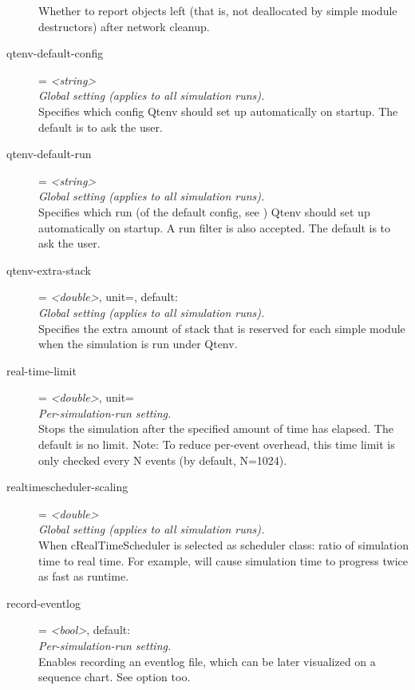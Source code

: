 \begin{description}
    Whether to report objects left (that is, not deallocated by simple module
    destructors) after network cleanup.
\item[qtenv-default-config] = \textit{<string>}\\
    \textit{Global setting (applies to all simulation runs).}\\
    Specifies which config Qtenv should set up automatically on startup. The
    default is to ask the user.
\item[qtenv-default-run] = \textit{<string>}\\
    \textit{Global setting (applies to all simulation runs).}\\
    Specifies which run (of the default config, see
    ) Qtenv should set up
    automatically on startup. A run filter is also accepted. The default is to
    ask the user.
\item[qtenv-extra-stack] = \textit{<double>}, unit=, default: \\
    \textit{Global setting (applies to all simulation runs).}\\
    Specifies the extra amount of stack that is reserved for each
     simple module when the simulation is run under Qtenv.
\item[real-time-limit] = \textit{<double>}, unit=\\
    \textit{Per-simulation-run setting.}\\
    Stops the simulation after the specified amount of time has elapsed. The
    default is no limit. Note: To reduce per-event overhead, this time limit is
    only checked every N events (by default, N=1024).
\item[realtimescheduler-scaling] = \textit{<double>}\\
    \textit{Global setting (applies to all simulation runs).}\\
    When cRealTimeScheduler is selected as scheduler class: ratio of simulation
    time to real time. For example,
     will cause
    simulation time to progress twice as fast as runtime.
\item[record-eventlog] = \textit{<bool>}, default: \\
    \textit{Per-simulation-run setting.}\\
    Enables recording an eventlog file, which can be later visualized on a
    sequence chart. See  option too.

\end{description}
